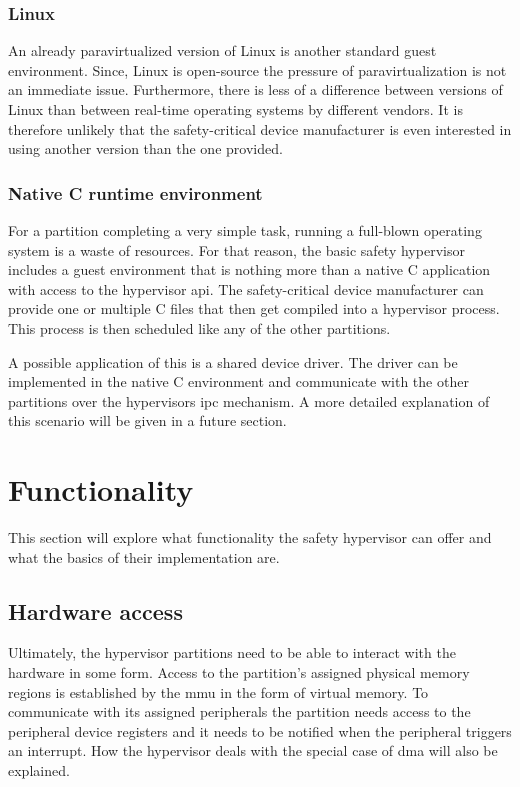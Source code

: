 \subsubsection{Linux}
An already paravirtualized version of Linux is another standard guest environment. Since, Linux is open-source the pressure of paravirtualization is not an immediate issue. Furthermore, there is less of a difference between versions of Linux than between real-time operating systems by different vendors. It is therefore unlikely that the safety-critical device manufacturer is even interested in using another version than the one provided.

\subsubsection{Native C runtime environment}
For a partition completing a very simple task, running a full-blown operating system is a waste of resources. For that reason, the basic safety hypervisor includes a guest environment that is nothing more than a native C application with access to the hypervisor \acrshort{api}. The safety-critical device manufacturer can provide one or multiple C files that then get compiled into a hypervisor process. This process is then scheduled like any of the other partitions.

A possible application of this is a shared device driver. The driver can be implemented in the native C environment and communicate with the other partitions over the hypervisors \acrshort{ipc} mechanism. A more detailed explanation of this scenario will be given in a future section.


\section{Functionality}
This section will explore what functionality the safety hypervisor can offer and what the basics of their implementation are.
\subsection{Hardware access}
Ultimately, the hypervisor partitions need to be able to interact with the hardware in some form. Access to the partition's assigned physical memory regions is established by the \acrshort{mmu} in the form of virtual memory.
To communicate with its assigned peripherals the partition needs access to the peripheral device registers and it needs to be notified when the peripheral triggers an interrupt. How the hypervisor deals with the special case of \acrfull{dma} will also be explained.

